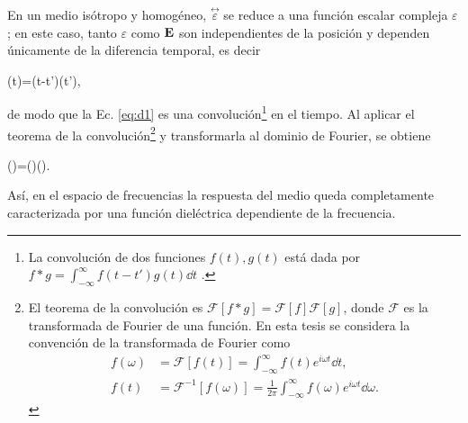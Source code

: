 En un medio isótropo y homogéneo, $\stackrel{\leftrightarrow}{\varepsilon}$ se reduce a una función escalar compleja $\varepsilon$ \cite{jacksonClassicalElectrodynamics2021a}; en este caso, tanto $\varepsilon$ como $\vb{E}$ son independientes de la posición y dependen únicamente de la diferencia temporal, es decir \cite{jacksonClassicalElectrodynamics2021a}
%
\begin{tcolorbox}
	(t)=\int\varepsilon(t-t')(t'),
	\label{eq:d1} 
\end{tcolorbox}
%	
\noindent de modo que la Ec. \eqref{eq:d1} es una convolución\footnote{La convolución de dos funciones $f(t), g(t)$ está dada por $f\ast g=\int_{-\infty}^{\infty}f(t-t')g(t)\dd{t}$ \cite{arfkenMathematicalMethodsPhysicists2011a}.} en el tiempo. Al aplicar el teorema de la convolución\footnote{El teorema de la convolución es $\mathscr{F}[f\ast g]=\mathscr{F}[f]\mathscr{F}[g]$, donde $\mathscr{F}$ es la transformada de Fourier de una función. En esta tesis se considera la convención de la transformada de Fourier como \cite{arfkenMathematicalMethodsPhysicists2011a}
	\begin{align*}
		 f(\omega)&=\mathscr{F}[f(t)]=\int_{-\infty}^{\infty}f(t)e^{i\omega t}\dd{t},\\ f(t)&=\mathscr{F}^{-1}[f(\omega)]=\frac{1}{2\pi}\int_{-\infty}^{\infty}f(\omega)e^{i\omega t}\dd{\omega}.
	\end{align*}}
 y transformarla al dominio de Fourier, se obtiene \cite{bohrenAbsorptionScatteringLight2008}
%
\begin{tcolorbox}
		(\omega)=\varepsilon(\omega)(\omega).
	\label{eq:d3} 
\end{tcolorbox}
%	
\noindent Así, en el espacio de frecuencias la respuesta del medio queda completamente caracterizada por una función dieléctrica dependiente de la frecuencia.

